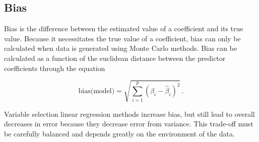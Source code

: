 \documentclass{article}
\begin{document}
\subsection{Bias}
Bias is the difference between the estimated value of a coefficient and its true value. Because it necessitates the true value of a coefficient, bias can only be calculated when data is generated using Monte Carlo methods. Bias can be calculated as a function of the euclidean distance between the predictor coefficients through the equation

\begin{equation}
	\text{bias} \text{(model)} = \sqrt{\sum_{i=1}^{p}\left( \beta_i - \hat{\beta}_i \right)^2} \, .
\end{equation}

Variable selection linear regression methods increase bias, but still lead to overall decreases in error because they decrease error from variance. This trade-off must be carefully balanced and depends greatly on the environment of the data.


\newpage


\end{document}
